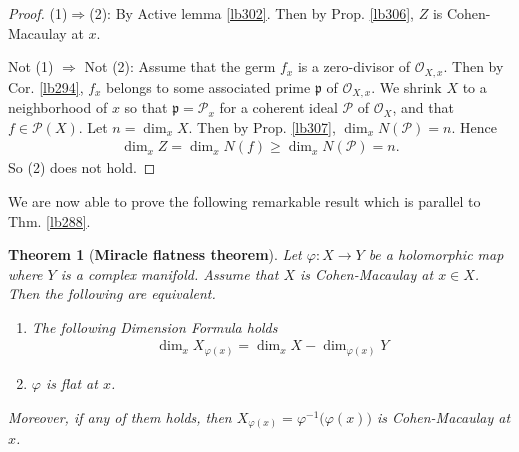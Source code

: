 \documentclass[12pt,b5paper,notitlepage]{report}
\theoremstyle{definition}
\theoremstyle{plain}
\newtheorem{thm}[df]{Theorem}
\newcommand{\scr}{\mathscr}
\newcommand{\pk}{\mathfrak p}
\numberwithin{equation}{section}
\begin{document}
\begin{proof}
(1)$\Rightarrow$(2): By Active lemma \ref{lb302}. Then by Prop. \ref{lb306}, $Z$ is Cohen-Macaulay at $x$.

Not (1) $\Rightarrow$ Not (2): Assume that the germ $f_x$ is a zero-divisor of $\scr O_{X,x}$. Then by Cor. \ref{lb294}, $f_x$ belongs to some associated prime $\pk$ of $\scr O_{X,x}$. We shrink $X$ to a neighborhood of $x$ so that $\pk=\scr P_x$ for a coherent ideal $\scr P$ of $\scr O_X$, and that $f\in\scr P(X)$. Let $n=\dim_xX$. Then by Prop. \ref{lb307}, $\dim_xN(\scr P)=n$. Hence
\begin{align*}
\dim_xZ=\dim_x N(f)\geq\dim_x N(\scr P)=n.
\end{align*}
So (2) does not hold.
\end{proof}


We are now able to prove the following remarkable result which is parallel to Thm. \ref{lb288}.


\begin{thm}[\textbf{Miracle flatness theorem}]\label{lb308}  
Let $\varphi:X\rightarrow Y$ be a holomorphic map where $Y$ is a complex manifold. Assume that $X$ is Cohen-Macaulay at $x\in X$.  Then the following are equivalent.
\begin{enumerate}[label=(\arabic*)]
\item The following Dimension Formula holds
\begin{align}
\dim_x X_{\varphi(x)}=\dim_x X-\dim_{\varphi(x)} Y\label{eq131}
\end{align}
\item $\varphi$ is flat at $x$.
\end{enumerate}
Moreover, if any of them holds, then $X_{\varphi(x)}=\varphi^{-1}\big(\varphi(x)\big)$ is Cohen-Macaulay at $x$.
\end{thm}
\end{document}

